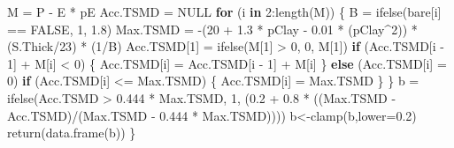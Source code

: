 \documentclass[
  10pt,
  b5paper,
]{book}
\newenvironment{Shaded}{\begin{snugshade}}{\end{snugshade}}
\newcommand{\AttributeTok}[1]{\textcolor[rgb]{0.77,0.63,0.00}{#1}}
\newcommand{\ConstantTok}[1]{\textcolor[rgb]{0.00,0.00,0.00}{#1}}
\newcommand{\ControlFlowTok}[1]{\textcolor[rgb]{0.13,0.29,0.53}{\textbf{#1}}}
\newcommand{\DecValTok}[1]{\textcolor[rgb]{0.00,0.00,0.81}{#1}}
\newcommand{\FloatTok}[1]{\textcolor[rgb]{0.00,0.00,0.81}{#1}}
\newcommand{\FunctionTok}[1]{\textcolor[rgb]{0.00,0.00,0.00}{#1}}
\newcommand{\NormalTok}[1]{#1}
\newcommand{\OtherTok}[1]{\textcolor[rgb]{0.56,0.35,0.01}{#1}}
\newcommand{\SpecialCharTok}[1]{\textcolor[rgb]{0.00,0.00,0.00}{#1}}
\begin{document}
\begin{Shaded}
\begin{Highlighting}[]
\NormalTok{    M }\OtherTok{=}\NormalTok{ P }\SpecialCharTok{{-}}\NormalTok{ E }\SpecialCharTok{*}\NormalTok{ pE}
\NormalTok{    Acc.TSMD }\OtherTok{=} \ConstantTok{NULL}
    \ControlFlowTok{for}\NormalTok{ (i }\ControlFlowTok{in} \DecValTok{2}\SpecialCharTok{:}\FunctionTok{length}\NormalTok{(M)) \{}
\NormalTok{      B }\OtherTok{=} \FunctionTok{ifelse}\NormalTok{(bare[i] }\SpecialCharTok{==} \ConstantTok{FALSE}\NormalTok{, }\DecValTok{1}\NormalTok{, }\FloatTok{1.8}\NormalTok{)}
\NormalTok{      Max.TSMD }\OtherTok{=} \SpecialCharTok{{-}}\NormalTok{(}\DecValTok{20} \SpecialCharTok{+} \FloatTok{1.3} \SpecialCharTok{*}\NormalTok{ pClay }\SpecialCharTok{{-}} \FloatTok{0.01} \SpecialCharTok{*}\NormalTok{ (pClay}\SpecialCharTok{\^{}}\DecValTok{2}\NormalTok{)) }\SpecialCharTok{*}\NormalTok{ (S.Thick}\SpecialCharTok{/}\DecValTok{23}\NormalTok{) }\SpecialCharTok{*}\NormalTok{ (}\DecValTok{1}\SpecialCharTok{/}\NormalTok{B)}
\NormalTok{      Acc.TSMD[}\DecValTok{1}\NormalTok{] }\OtherTok{=} \FunctionTok{ifelse}\NormalTok{(M[}\DecValTok{1}\NormalTok{] }\SpecialCharTok{\textgreater{}} \DecValTok{0}\NormalTok{, }\DecValTok{0}\NormalTok{, M[}\DecValTok{1}\NormalTok{])}
      \ControlFlowTok{if}\NormalTok{ (Acc.TSMD[i }\SpecialCharTok{{-}} \DecValTok{1}\NormalTok{] }\SpecialCharTok{+}\NormalTok{ M[i] }\SpecialCharTok{\textless{}} \DecValTok{0}\NormalTok{) \{}
\NormalTok{        Acc.TSMD[i] }\OtherTok{=}\NormalTok{ Acc.TSMD[i }\SpecialCharTok{{-}} \DecValTok{1}\NormalTok{] }\SpecialCharTok{+}\NormalTok{ M[i]}
\NormalTok{      \}}
      \ControlFlowTok{else}\NormalTok{ (Acc.TSMD[i] }\OtherTok{=} \DecValTok{0}\NormalTok{)}
      \ControlFlowTok{if}\NormalTok{ (Acc.TSMD[i] }\SpecialCharTok{\textless{}=}\NormalTok{ Max.TSMD) \{}
\NormalTok{        Acc.TSMD[i] }\OtherTok{=}\NormalTok{ Max.TSMD}
\NormalTok{      \}}
\NormalTok{    \}}
\NormalTok{    b }\OtherTok{=} \FunctionTok{ifelse}\NormalTok{(Acc.TSMD }\SpecialCharTok{\textgreater{}} \FloatTok{0.444} \SpecialCharTok{*}\NormalTok{ Max.TSMD, }\DecValTok{1}\NormalTok{, (}\FloatTok{0.2} \SpecialCharTok{+} \FloatTok{0.8} \SpecialCharTok{*}\NormalTok{ ((Max.TSMD }\SpecialCharTok{{-}} 
\NormalTok{                                                                Acc.TSMD)}\SpecialCharTok{/}\NormalTok{(Max.TSMD }\SpecialCharTok{{-}} \FloatTok{0.444} \SpecialCharTok{*}\NormalTok{ Max.TSMD))))}
\NormalTok{    b}\OtherTok{\textless{}{-}}\FunctionTok{clamp}\NormalTok{(b,}\AttributeTok{lower=}\FloatTok{0.2}\NormalTok{)}
    \FunctionTok{return}\NormalTok{(}\FunctionTok{data.frame}\NormalTok{(b))   }
\NormalTok{  \}}
  

\end{Highlighting}
\end{Shaded}
\end{document}
